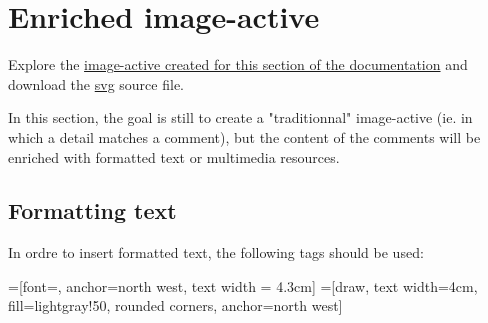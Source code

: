 \section{Enriched image-active}

Explore the \href{http://images-actives.crdp-versailles.fr/beta/demo/tuto/xia2}{image-active 
created for this section of the documentation} and download the 
\href{http://images-actives.crdp-versailles.fr/beta/demo/tuto/xia2/svg/xia2.svg}{svg} source file.

In this section, the goal is still to create a "traditionnal" image-active 
(ie. in which a detail matches a comment), but the content of the comments 
will be enriched with  formatted text or multimedia resources.

\subsection{Formatting text}

In ordre to insert formatted text, the following tags should be used:

=[font=\sffamily, anchor=north west, text width = 4.3cm]
=[draw, text width=4cm, fill=lightgray!50, rounded corners, anchor=north west]


